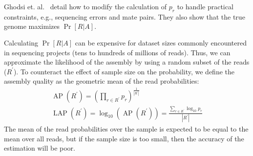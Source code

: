 Ghodsi et. al.~\cite{LAP} detail how to modify the calculation of $p_r$ to handle practical constraints, e.g., sequencing errors and mate pairs.
They also show that the true genome maximizes $\Pr[R|A]$.

Calculating $\Pr[R|A]$ can be expensive for dataset sizes commonly encountered in sequencing projects (tens to hundreds of millions of reads).
Thus, we can approximate the likelihood of the assembly by using a random subset of the reads ($R^\prime$).
To counteract the effect of sample size on the probability, we define the assembly quality as the geometric mean of the read probabilities:
%
\begin{align}
\label{average_log_probability}
  \operatorname{AP}(R^\prime) = 
  \left(\prod_{r \in R^\prime} p_r\right)^{\frac{1}{\left|R^\prime\right|}} \nonumber  \\
  \operatorname{LAP}(R^\prime) = \log_{10} \left( \operatorname{AP}(R^\prime) \right) = \frac{\sum_{r \in R^\prime} \log_{10} p_r}{\left|R^\prime\right|}
\end{align}
%
The mean of the read probabilities over the sample is expected to be equal to the mean over all reads, but if the sample size is too small, then the accuracy of the estimation will be poor.

